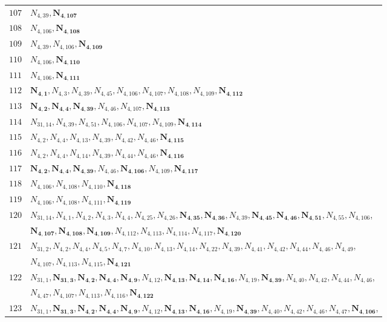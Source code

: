 \documentclass{amsart}
\theoremstyle{plain}
\theoremstyle{definition}
\theoremstyle{remark}
\begin{document}
{\begin{longtable}{ll}
$107$ & $N_{4,39}, \bm{N_{4,107}}$\\
$108$ & $N_{4,106}, \bm{N_{4,108}}$\\
$109$ & $N_{4,39}, N_{4,106}, \bm{N_{4,109}}$\\
$110$ & $N_{4,106}, \bm{N_{4,110}}$\\
$111$ & $N_{4,106}, \bm{N_{4,111}}$\\
$112$ & $\bm{N_{4,1}}, N_{4,3}, N_{4,39}, N_{4,45}, N_{4,106}, N_{4,107}, N_{4,108}, N_{4,109}, \bm{N_{4,112}}$\\
$113$ & $\bm{N_{4,2}}, \bm{N_{4,4}}, \bm{N_{4,39}}, N_{4,46}, N_{4,107}, \bm{N_{4,113}}$\\
$114$ & $N_{31,14}, N_{4,39}, N_{4,51}, N_{4,106}, N_{4,107}, N_{4,109}, \bm{N_{4,114}}$\\
$115$ & $N_{4,2}, N_{4,4}, N_{4,13}, N_{4,39}, N_{4,42}, N_{4,46}, \bm{N_{4,115}}$\\
$116$ & $N_{4,2}, N_{4,4}, N_{4,14}, N_{4,39}, N_{4,44}, N_{4,46}, \bm{N_{4,116}}$\\
$117$ & $\bm{N_{4,2}}, \bm{N_{4,4}}, \bm{N_{4,39}}, N_{4,46}, \bm{N_{4,106}}, N_{4,109}, \bm{N_{4,117}}$\\
$118$ & $N_{4,106}, N_{4,108}, N_{4,110}, \bm{N_{4,118}}$\\
$119$ & $N_{4,106}, N_{4,108}, N_{4,111}, \bm{N_{4,119}}$\\
$120$ & $N_{31,14}, N_{4,1}, N_{4,2}, N_{4,3}, N_{4,4}, N_{4,25}, N_{4,26}, \bm{N_{4,35}}, \bm{N_{4,36}}, N_{4,39}, \bm{N_{4,45}}, \bm{N_{4,46}}, \bm{N_{4,51}}, N_{4,55}, N_{4,106}$,\\ 
& $\bm{N_{4,107}}, \bm{N_{4,108}}, \bm{N_{4,109}}, N_{4,112}, N_{4,113}, N_{4,114}, N_{4,117}, \bm{N_{4,120}}$\\
$121$ & $N_{31,2}, N_{4,2}, N_{4,4}, N_{4,5}, N_{4,7}, N_{4,10}, N_{4,13}, N_{4,14}, N_{4,22}, N_{4,39}, N_{4,41}, N_{4,42}, N_{4,44}, N_{4,46}, N_{4,49}$,\\ 
& $N_{4,107}, N_{4,113}, N_{4,115}, \bm{N_{4,121}}$\\
$122$ & $N_{31,1}, \bm{N_{31,3}}, \bm{N_{4,2}}, \bm{N_{4,4}}, \bm{N_{4,9}}, N_{4,12}, \bm{N_{4,13}}, \bm{N_{4,14}}, \bm{N_{4,16}}, N_{4,19}, \bm{N_{4,39}}, N_{4,40}, N_{4,42}, N_{4,44}, N_{4,46}$,\\ 
& $N_{4,47}, N_{4,107}, N_{4,113}, N_{4,116}, \bm{N_{4,122}}$\\
$123$ & $N_{31,1}, \bm{N_{31,3}}, \bm{N_{4,2}}, \bm{N_{4,4}}, \bm{N_{4,9}}, N_{4,12}, \bm{N_{4,13}}, \bm{N_{4,16}}, N_{4,19}, \bm{N_{4,39}}, N_{4,40}, N_{4,42}, N_{4,46}, N_{4,47}, \bm{N_{4,106}}$,\\ 

\end{longtable}}
\end{document}
